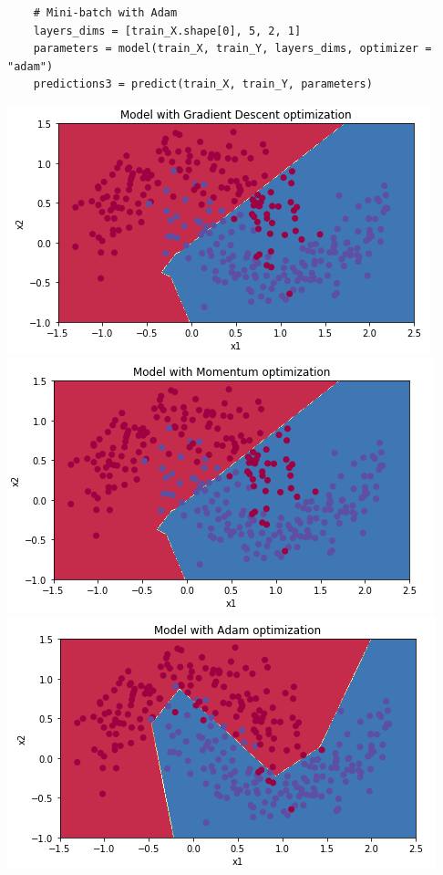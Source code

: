\documentclass[11pt, a4paper]{article}
\begin{document}
\begin{spacing}{1.1}
\begin{lstlisting}
	# Mini-batch with Adam
	layers_dims = [train_X.shape[0], 5, 2, 1]
	parameters = model(train_X, train_Y, layers_dims, optimizer = "adam")
	predictions3 = predict(train_X, train_Y, parameters)	\end{lstlisting}
	\begin{center}
	\includegraphics[scale=.43]{opt_model_1} \hspace*{2mm} \includegraphics[scale=.43]{opt_model_2} \hspace*{2mm} \includegraphics[scale=.43]{opt_model_3} \\

\end{center}
\end{spacing}
\end{document}
